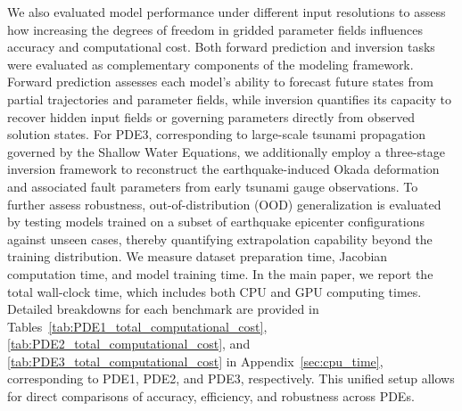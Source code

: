We also evaluated model performance under different input resolutions to assess how increasing the degrees of freedom in gridded parameter fields influences accuracy and computational cost. Both forward prediction and inversion tasks were evaluated as complementary components of the modeling framework. Forward prediction assesses each model’s ability to forecast future states from partial trajectories and parameter fields, while inversion quantifies its capacity to recover hidden input fields or governing parameters directly from observed solution states. For PDE3, corresponding to large-scale tsunami propagation governed by the Shallow Water Equations, we additionally employ a three-stage inversion framework to reconstruct the earthquake-induced Okada deformation and associated fault parameters from early tsunami gauge observations. To further assess robustness, out-of-distribution (OOD) generalization is evaluated by testing models trained on a subset of earthquake epicenter configurations against unseen cases, thereby quantifying extrapolation capability beyond the training distribution. We measure dataset preparation time, Jacobian computation time, and model training time. In the main paper, we report the total wall-clock time, which includes both CPU and GPU computing times. Detailed breakdowns for each benchmark are provided in Tables~\ref{tab:PDE1_total_computational_cost}, \ref{tab:PDE2_total_computational_cost}, and \ref{tab:PDE3_total_computational_cost} in Appendix~\ref{sec:cpu_time}, corresponding to PDE1, PDE2, and PDE3, respectively. This unified setup allows for direct comparisons of accuracy, efficiency, and robustness across PDEs.

